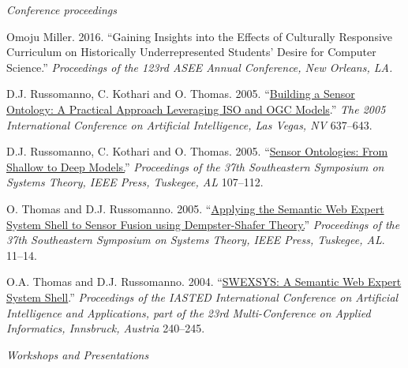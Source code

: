 \documentclass[11pt,article,oneside]{memoir}
\begin{document}
\bigskip 


\medskip

\noindent\emph{Conference proceedings \vspace{0.05in}}


\ind Omoju Miller. 2016. ``Gaining Insights into the Effects of Culturally Responsive Curriculum on Historically Underrepresented Students' Desire for Computer Science.'' \emph{Proceedings of the 123rd ASEE Annual Conference, New Orleans, LA.}

\ind D.J. Russomanno, C. Kothari and O. Thomas. 2005. ``\href{https://scholar.google.com/citations?view_op=view_citation&hl=en&user=E7z_wrwAAAAJ&sortby=pubdate&citation_for_view=E7z_wrwAAAAJ:u5HHmVD_uO8C}{Building a Sensor Ontology: A Practical Approach Leveraging ISO and OGC Models}.'' \emph{The 2005 International Conference on Artificial Intelligence, Las Vegas, NV} 637--643.

\ind D.J. Russomanno, C. Kothari and O. Thomas. 2005. ``\href{http://scholar.google.com/citations?view_op=view_citation&hl=en&user=E7z_wrwAAAAJ&citation_for_view=E7z_wrwAAAAJ:u-x6o8ySG0sC}{Sensor Ontologies: From Shallow to Deep Models.}'' \emph{Proceedings of the 37th Southeastern Symposium on Systems Theory, IEEE Press, Tuskegee, AL} 107--112.

\ind O. Thomas and D.J. Russomanno. 2005. ``\href{http://scholar.google.com/citations?view_op=view_citation&hl=en&user=E7z_wrwAAAAJ&citation_for_view=E7z_wrwAAAAJ:d1gkVwhDpl0C}{Applying the Semantic Web Expert System Shell to Sensor Fusion using Dempster-Shafer Theory.}'' \emph{Proceedings of the 37th Southeastern Symposium on Systems Theory, IEEE Press, Tuskegee, AL}. 11--14.

\ind O.A. Thomas and D.J. Russomanno. 2004. ``\href{http://scholar.google.com/citations?view_op=view_citation&hl=en&user=E7z_wrwAAAAJ&citation_for_view=E7z_wrwAAAAJ:2osOgNQ5qMEC}{SWEXSYS: A Semantic Web Expert System Shell}.'' \emph{Proceedings of the IASTED International Conference on Artificial Intelligence and Applications, part of the 23rd Multi-Conference on Applied Informatics, Innsbruck, Austria} 240--245.

\bigskip

\noindent\emph{Workshops and Presentations  \vspace{0.05in}}
\end{document}
